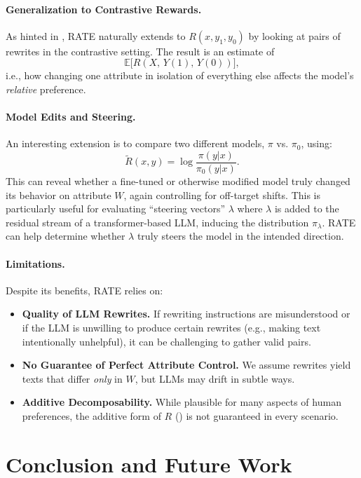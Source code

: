\documentclass{article}
\theoremstyle{definition}
\newcommand{\E}{\mathbb{E}}
\begin{document}
\paragraph{Generalization to Contrastive Rewards.}
As hinted in , RATE naturally extends to $R(x, y_1, y_0)$ by looking at pairs of rewrites in the contrastive setting. The result is an estimate of
\[
\E\bigl[R(X,\,Y(1),\,Y(0))\bigr],
\]
i.e., how changing one attribute in isolation of everything else affects the model's \emph{relative} preference.

\paragraph{Model Edits and Steering.}
An interesting extension is to compare two different models, $\pi$ vs. $\pi_0$, using:
\[
\tilde{R}(x,y) = \log\frac{\pi(y|x)}{\pi_0(y|x)}.
\]
This can reveal whether a fine-tuned or otherwise modified model truly changed its behavior on attribute $W$, again controlling for off-target shifts. This is particularly useful for evaluating ``steering vectors'' $\lambda$ where $\lambda$ is added to the residual stream of a transformer-based LLM, inducing the distribution $\pi_\lambda$. RATE can help determine whether $\lambda$ truly steers the model in the intended direction.

\paragraph{Limitations.}
Despite its benefits, RATE relies on:
\begin{itemize}
    \item \textbf{Quality of LLM Rewrites.} If rewriting instructions are misunderstood or if the LLM is unwilling to produce certain rewrites (e.g., making text intentionally unhelpful), it can be challenging to gather valid pairs.
    \item \textbf{No Guarantee of Perfect Attribute Control.} We assume rewrites yield texts that differ \emph{only} in $W$, but LLMs may drift in subtle ways.
    \item \textbf{Additive Decomposability.} While plausible for many aspects of human preferences, the additive form of $R$ () is not guaranteed in every scenario.
\end{itemize}

\section{Conclusion and Future Work}
\label{sec:conclusion}
\end{document}

